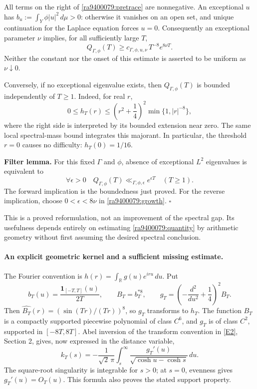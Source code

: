 \documentclass[11pt]{article}
\newcommand{\R}{\mathbb{R}}
\newcommand{\eref}[2]{\hyperlink{extra:#1:#2}{[E#2]}}
\begin{document}
All terms on the right of \eqref{ra9400079:pretrace} are nonnegative. An exceptional
$u$ has
$b_u:=\int_Y\phi|u|^2\,d\mu>0$: otherwise it vanishes on an open set, and
unique continuation for the Laplace equation forces $u=0$. Consequently an
exceptional parameter $\nu$ implies, for all sufficiently large $T$,
\begin{equation}\label{ra9400079:growth}
 Q_{\Gamma,\phi}(T)\ge
       c_{\Gamma,\phi,u,\nu}\,T^{-8}e^{8\nu T}.
\end{equation}
Neither the constant nor the onset of this estimate is asserted to be uniform
as $\nu\downarrow0$.

Conversely, if no exceptional eigenvalue exists, then $Q_{\Gamma,\phi}(T)$
is bounded independently of $T\ge1$. Indeed, for real $r$,
\[
 0\le h_T(r)\le
 \left(r^2+\frac14\right)^2\min\{1,|r|^{-8}\},
\]
where the right side is interpreted by its bounded extension near zero.
The same local spectral-mass bound integrates this majorant. In particular,
the threshold $r=0$ causes no difficulty: $h_T(0)=1/16$.

\textbf{Filter lemma.} For this fixed $\Gamma$ and $\phi$, absence of
exceptional $L^2$ eigenvalues is equivalent to
\begin{equation}\label{ra9400079:subexp}
 \forall\epsilon>0\quad
 Q_{\Gamma,\phi}(T)\ll_{\Gamma,\phi,\epsilon}e^{\epsilon T}
 \quad(T\ge1).
\end{equation}
The forward implication is the boundedness just proved. For the reverse
implication, choose $0<\epsilon<8\nu$ in \eqref{ra9400079:growth}.
\hfill$\square$

This is a proved reformulation, not an improvement of the spectral gap.
Its usefulness depends entirely on estimating \eqref{ra9400079:quantity} by
arithmetic geometry without first assuming the desired spectral conclusion.

\paragraph{An explicit geometric kernel and a sufficient missing estimate.}
The Fourier convention is $h(r)=\int_{\R}g(u)e^{iru}\,du$. Put
\[
 b_T(u)=\frac{\mathbf 1_{[-T,T]}(u)}{2T},\qquad
 B_T=b_T^{*8},\qquad
 g_T=\left(-\frac{d^2}{du^2}+\frac14\right)^2B_T.
\]
Then $\widehat{B_T}(r)=(\sin(Tr)/(Tr))^8$, so $g_T$ transforms to $h_T$.
The function $B_T$ is a compactly supported piecewise polynomial of class
$C^6$, and $g_T$ is of class $C^2$, supported in $[-8T,8T]$.
Abel inversion of the transform convention in \eref{9400079}{2}, Section 2,
gives, now expressed in the distance variable,
\begin{equation}\label{ra9400079:inverse}
 k_T(s)=-\frac1{\sqrt2\,\pi}
       \int_s^\infty\frac{g_T'(u)}{\sqrt{\cosh u-\cosh s}}\,du.
\end{equation}
The square-root singularity is integrable for $s>0$; at $s=0$, evenness gives
$g_T'(u)=O_T(u)$. This formula also proves the stated support property.
\end{document}
